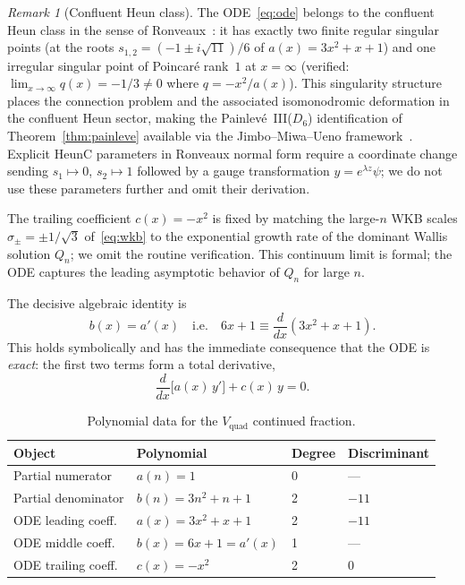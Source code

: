 \documentclass[11pt,a4paper]{article}
\theoremstyle{definition}
\theoremstyle{remark}
\newtheorem{remark}[theorem]{Remark}
\newcommand{\Vq}{V_{\mathrm{quad}}}
\begin{document}
\begin{remark}[Confluent Heun class]\label{rem:heunc}
The ODE~\eqref{eq:ode} belongs to the confluent Heun class in the
sense of Ronveaux~\cite{ronveaux1995}: it has exactly two finite
regular singular points (at the roots $s_{1,2}=(-1\pm i\sqrt{11})/6$
of $a(x)=3x^2+x+1$) and one irregular singular point of Poincar\'e
rank~$1$ at $x=\infty$ (verified: $\lim_{x\to\infty}q(x)=-1/3\ne 0$
where $q=-x^2/a(x)$). This singularity structure places the
connection problem and the associated isomonodromic deformation
in the confluent Heun sector, making the Painlev\'e~III($D_6$)
identification of Theorem~\ref{thm:painleve} available via the
Jimbo--Miwa--Ueno framework~\cite{jimbo1981}. Explicit HeunC
parameters in Ronveaux normal form require a coordinate change
sending $s_1\mapsto 0$, $s_2\mapsto 1$ followed by a gauge
transformation $y=e^{\lambda z}\psi$; we do not use these
parameters further and omit their derivation.
\end{remark}

The trailing coefficient $c(x)=-x^2$ is fixed by
matching the large-$n$ WKB scales
$\sigma_\pm = \pm 1/\sqrt{3}$ of~\eqref{eq:wkb}
to the exponential growth rate of the dominant Wallis
solution $Q_n$; we omit the routine verification.
This continuum limit is formal; the ODE captures the
leading asymptotic behavior of $Q_n$ for large $n$.

The decisive algebraic identity is
\begin{equation}\label{eq:exact-identity}
  b(x) = a'(x)
  \quad\text{i.e.}\quad
  6x+1 \equiv \frac{d}{dx}(3x^2+x+1).
\end{equation}
This holds symbolically and has the immediate
consequence that the ODE is \emph{exact}: the
first two terms form a total derivative,
\begin{equation}\label{eq:exact-ode}
  \frac{d}{dx}\bigl[a(x)\,y'\bigr]
  + c(x)\,y = 0.
\end{equation}

\begin{table}[ht]
\centering
\caption{Polynomial data for the
$\Vq$ continued fraction.}
\label{tab:poly}
\small
\begin{tabular}{@{}llll@{}}
\toprule
Object & Polynomial & Degree & Discriminant \\
\midrule
Partial numerator & $a(n) = 1$ & 0 & --- \\
Partial denominator & $b(n) = 3n^2+n+1$ & 2 & $-11$ \\
ODE leading coeff.\ & $a(x) = 3x^2+x+1$ & 2 & $-11$ \\
ODE middle coeff.\ & $b(x) = 6x+1 = a'(x)$ & 1 & --- \\
ODE trailing coeff.\ & $c(x) = -x^2$ & 2 & $0$ \\
\bottomrule
\end{tabular}
\end{table}
\end{document}
